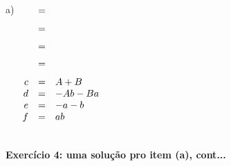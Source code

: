 \documentclass[oneside,12pt]{article}
\begin{document}
\msk

a) $\scalebox{1.0}{$
    \begin{array}[t]{rcl}
      \ga{f1} &=& \ga{f3}   \\[7pt]
      \ga{f1} &=& \ga{f1.5} \\[6pt]
              &=& \ga{f1.6} \\[6pt]
              &=& \ga{f2}   \\[7pt]
            c &=& A+B    \\
            d &=& -Ab-Ba \\
            e &=& -a-b   \\
            f &=& ab     \\[15pt]
    \end{array}
    $}
   $

\newpage


{\bf Exercício 4: uma solução pro item (a), cont...}
\end{document}
